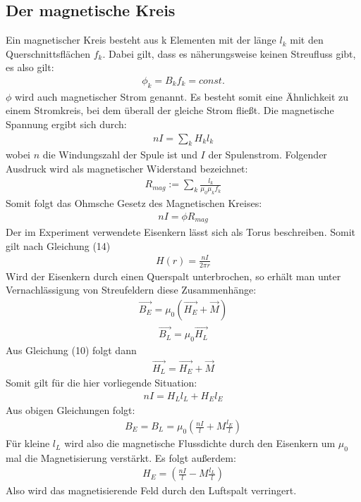 \documentclass[a4paper,10pt]{scrartcl}
\begin{document}
	\subsection{Der magnetische Kreis}
	
		Ein magnetischer Kreis besteht aus k Elementen mit der länge \(l_{k}\) mit den Querschnittsflächen \(f_{k}\). Dabei gilt, dass es näherungsweise keinen Streufluss gibt, es also gilt:
		\begin{align}
		\phi_{k}=B_{k}f_{k}=const.
		\end{align}
		\(\phi\) wird auch magnetischer Strom genannt.
		Es besteht somit eine Ähnlichkeit zu einem Stromkreis, bei dem überall der gleiche Strom fließt. Die magnetische Spannung ergibt sich durch:
		\begin{align}
		nI=\sum_{k}^{}H_{k}l_{k}
		\end{align}
		wobei \(n\) die Windungszahl der Spule ist und \(I\) der Spulenstrom. Folgender Ausdruck wird als magnetischer Widerstand bezeichnet:
		\begin{align}
		R_{mag}:=\sum_{k}^{}\frac{l_{k}}{\mu_{0}\mu_{k}f_{k}}
		\end{align}
		Somit folgt das Ohmsche Gesetz des Magnetischen Kreises:
		\begin{align}
		nI=\phi R_{mag}
		\end{align}
		Der im Experiment verwendete Eisenkern lässt sich  als Torus beschreiben. Somit gilt nach Gleichung (14)
		\begin{align}
		H(r)=\frac{nI}{2\pi r}
		\end{align}
		Wird der Eisenkern durch einen Querspalt unterbrochen, so erhält man unter Vernachlässigung von Streufeldern diese Zusammenhänge:
		\begin{align}
		\vec{B_{E}}=\mu_{0}(\vec{H_{E}}+\vec{M})
		\end{align}
		\begin{align}
		\vec{B_{L}}=\mu_{0}\vec{H_{L}}
		\end{align}
		Aus Gleichung (10) folgt dann
		\begin{align}
		\vec{H_{L}}=\vec{H_{E}}+\vec{M}
		\end{align}
		Somit gilt für die hier vorliegende Situation:
		\begin{align}
		nI=H_{L}l_{L}+H_{E}l_{E}
		\end{align}
		Aus obigen Gleichungen folgt:
		\begin{align}
		B_{E}=B_{L}=\mu_{0}(\frac{nI}{l}+M\frac{l_{E}}{l})
		\end{align}
		Für kleine \(l_{L}\) wird also die magnetische Flussdichte durch den Eisenkern um \(\mu_{0}\) mal die Magnetisierung verstärkt. Es folgt außerdem:
		\begin{align}
		H_{E}=(\frac{nI}{l}-M\frac{l_{L}}{l})
		\end{align}
		Also wird das magnetisierende Feld durch den Luftspalt verringert.
		
\end{document}
